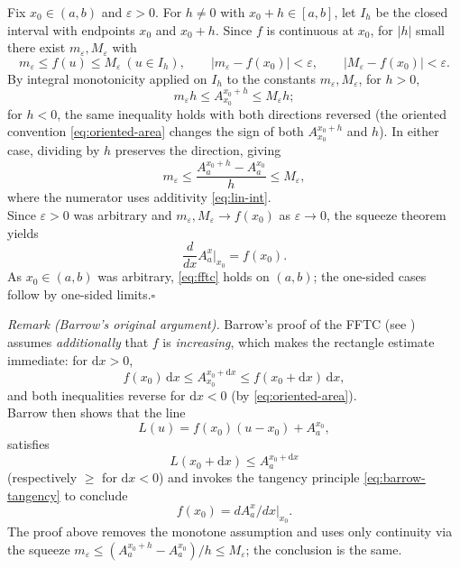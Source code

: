 \documentclass[11pt,reqno]{amsart}
\makeatletter
\theoremstyle{redplain}
\renewenvironment{proof}[1][Proof]{\noindent\textbf{#1.}\ }{\ }
\renewenvironment{proof}[1][\proofname]{%
	\proof@ORIG[#1]\mbox{}\par\nobreak
}{%
	\endproof@ORIG
}
\makeatother
\begin{document}
\begin{proof}[Proof of \autoref{thm:fftc}]
	Fix $x_0\in(a,b)$ and $\varepsilon>0$. For $h\ne 0$ with $x_0+h\in[a,b]$, let $I_h$ be the closed interval with endpoints $x_0$ and $x_0+h$. Since $f$ is continuous at $x_0$, for $|h|$ small there exist $m_\varepsilon,M_\varepsilon$ with
	\[
	m_\varepsilon\le f(u)\le M_\varepsilon\ (u\in I_h),
	\qquad
	|m_\varepsilon-f(x_0)|<\varepsilon,
	\qquad
	|M_\varepsilon-f(x_0)|<\varepsilon.
	\]
	By integral monotonicity applied on $I_h$ to the constants $m_\varepsilon,M_\varepsilon$, for $h>0$,
	\[
	m_\varepsilon h
	\le A_{x_0}^{x_0+h}
	\le M_\varepsilon h;
	\]
	for $h<0$, the same inequality holds with both directions reversed (the oriented convention \autoref{eq:oriented-area} changes the sign of both $A_{x_0}^{x_0+h}$ and $h$). In either case, dividing by $h$ preserves the direction, giving
	\[
	m_\varepsilon
	\le \frac{A_a^{x_0+h}-A_a^{x_0}}{h}
	\le M_\varepsilon,
	\]
	where the numerator uses additivity \autoref{eq:lin-int}.\\ Since $\varepsilon>0$ was arbitrary and $m_\varepsilon,M_\varepsilon\to f(x_0)$ as $\varepsilon\to 0$, the squeeze theorem yields
	\[
	\frac{d}{dx}A_a^{x}\Big|_{x_0}=f(x_0).
	\]
	As $x_0\in(a,b)$ was arbitrary, \autoref{eq:fftc} holds on $(a,b)$; the one-sided cases follow by one-sided limits.\hfill$\square$
\end{proof}

\noindent\emph{Remark (Barrow's original argument).} Barrow's proof of the FFTC \cite[Lecture~X, \S 11]{Barrow1916} (see \cite[\S 2--3]{Lopez2026}) assumes \emph{additionally} that $f$ is \emph{increasing}, which makes the rectangle estimate immediate: for $\mathrm{d}x>0$,
\[
	f(x_0)\,\mathrm{d}x\le A_{x_0}^{x_0+\mathrm{d}x}\le f(x_0+\mathrm{d}x)\,\mathrm{d}x,
\]
and both inequalities reverse for $\mathrm{d}x<0$ (by \autoref{eq:oriented-area}).\\ Barrow then shows that the line $$L(u)=f(x_0)(u-x_0)+A_a^{x_0},$$ satisfies $$L(x_0+\mathrm{d}x)\le A_a^{x_0+\mathrm{d}x}$$ (respectively $\ge$ for $\mathrm{d}x<0$) and invokes the tangency principle \autoref{eq:barrow-tangency} to conclude $$f(x_0)=dA_a^x/dx|_{x_0}.$$ The proof above removes the monotone assumption and uses only continuity via the squeeze $m_\varepsilon\le (A_a^{x_0+h}-A_a^{x_0})/h\le M_\varepsilon$; the conclusion is the same.
\end{document}
